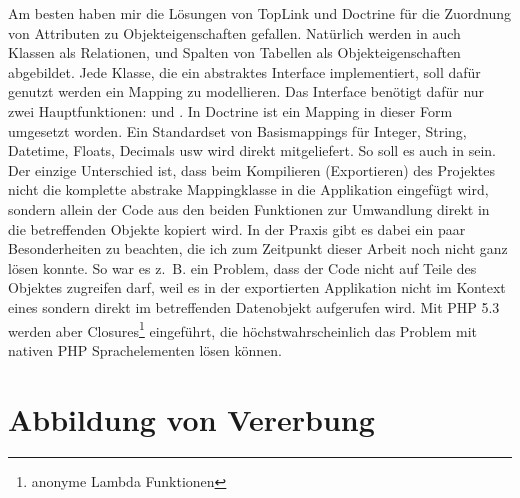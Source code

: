 Am besten haben mir die Lösungen von TopLink und Doctrine für die Zuordnung von Attributen zu Objekteigenschaften gefallen. Natürlich werden in auch \PSCORM Klassen als Relationen, und Spalten von Tabellen als Objekteigenschaften abgebildet. Jede Klasse, die ein abstraktes Interface  implementiert, soll dafür genutzt werden ein Mapping zu modellieren. Das Interface benötigt dafür nur zwei Hauptfunktionen:  und . In Doctrine ist ein Mapping in dieser Form umgesetzt worden. Ein Standardset von Basismappings für Integer, String, Datetime, Floats, Decimals usw wird direkt mitgeliefert. So soll es auch in \PSCORM sein. Der einzige Unterschied ist, dass beim Kompilieren (Exportieren) des Projektes nicht die komplette abstrake Mappingklasse in die Applikation eingefügt wird, sondern allein der Code aus den beiden Funktionen zur Umwandlung direkt in die betreffenden Objekte kopiert wird. In der Praxis gibt es dabei ein paar Besonderheiten zu beachten, die ich zum Zeitpunkt dieser Arbeit noch nicht ganz lösen konnte. So war es z.~B. ein Problem, dass der Code nicht auf Teile des Objektes zugreifen darf, weil es in der exportierten Applikation nicht im Kontext eines  sondern direkt im betreffenden Datenobjekt aufgerufen wird. Mit PHP 5.3 werden aber Closures\footnote{anonyme Lambda Funktionen} eingeführt, die höchstwahrscheinlich das Problem mit nativen PHP Sprachelementen lösen können. \\

\section{Abbildung von Vererbung}


